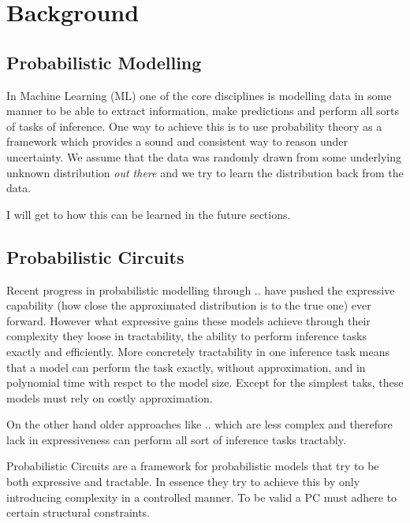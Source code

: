 \renewcommand{\vec}[1]{\textbf{#1}}
\newcommand{\norm}[1]{\left\lVert#1\right\rVert}


\chapter{Background}
\label{cha:background}

\section{Probabilistic Modelling}
\label{sec:pm}

In Machine Learning (ML) one of the core disciplines is modelling data in some manner to be able to 
extract information, make predictions and perform all sorts of tasks of inference. 
One way to achieve this is to use probability theory as a framework which provides a sound and consistent way to
reason under uncertainty. We assume that the data was randomly  drawn from some underlying unknown distribution
\emph{out there} and we try to learn the distribution back from the data. \cite{pc_intro}

I will get to how this can be learned in the future sections.




\section{Probabilistic Circuits}
\label{sec:pc}

Recent progress in probabilistic modelling through .. have pushed the expressive capability (how close the 
approximated distribution is to the true one) ever forward. However what expressive gains these models achieve through 
their complexity they loose in tractability, the ability to perform inference tasks exactly and efficiently.
More concretely tractability in one inference task means that a model can perform the task exactly, without approximation, and in polynomial time with respct to the model size.
Except for the simplest taks, these models must rely on costly approximation.

On the other hand older approaches like .. which are less complex and therefore lack in expressiveness can perform 
all sort of inference tasks tractably.

Probabilistic Circuits are a framework for probabilistic models that try to be both expressive and tractable. 
In essence they try to achieve this by only introducing complexity in a controlled manner. To be valid a PC must 
adhere to certain structural constraints. 

